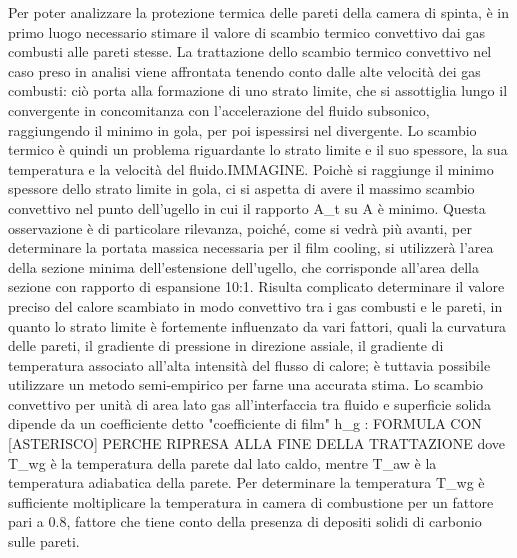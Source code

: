 Per poter analizzare la protezione termica delle pareti della camera di spinta, è in primo luogo necessario stimare il valore di scambio termico convettivo dai gas combusti alle pareti stesse. 
La trattazione dello scambio termico convettivo nel caso preso in analisi viene affrontata tenendo conto dalle alte velocità dei gas combusti: ciò porta alla formazione di uno strato limite, che si assottiglia lungo il convergente in concomitanza con l'accelerazione del fluido subsonico, raggiungendo il minimo in gola, per poi ispessirsi nel divergente. Lo scambio termico è quindi un problema riguardante lo strato limite e il suo spessore, la sua temperatura e la velocità del fluido.IMMAGINE. 
Poichè si raggiunge il minimo spessore dello strato limite in gola, ci si aspetta di avere il massimo scambio convettivo nel punto dell'ugello in cui il rapporto A_t su A è minimo. Questa osservazione è di particolare rilevanza, poiché, come si vedrà più avanti, per determinare la portata massica necessaria per il film cooling, si utilizzerà l'area della sezione minima dell'estensione dell'ugello, che corrisponde all'area della sezione con rapporto di espansione 10:1.
Risulta complicato determinare il valore preciso del calore scambiato in modo convettivo tra i gas combusti e le pareti, in quanto lo strato limite è fortemente influenzato da vari fattori, quali la curvatura delle pareti, il gradiente di pressione in direzione assiale, il gradiente di temperatura associato all'alta intensità del flusso di calore; è tuttavia possibile utilizzare un metodo semi-empirico per farne una accurata stima.
Lo scambio convettivo per unità di area lato gas all’interfaccia tra fluido e superficie solida dipende da un coefficiente detto "coefficiente di film" h_g : FORMULA CON [ASTERISCO] PERCHE RIPRESA ALLA FINE DELLA TRATTAZIONE
dove T_{wg} è la temperatura della parete dal lato caldo, mentre T_{aw} è la temperatura adiabatica della parete. Per determinare la temperatura T_{wg} è sufficiente moltiplicare la temperatura in camera di combustione per un fattore pari a 0.8, fattore che tiene conto della presenza di depositi solidi di carbonio sulle pareti.
